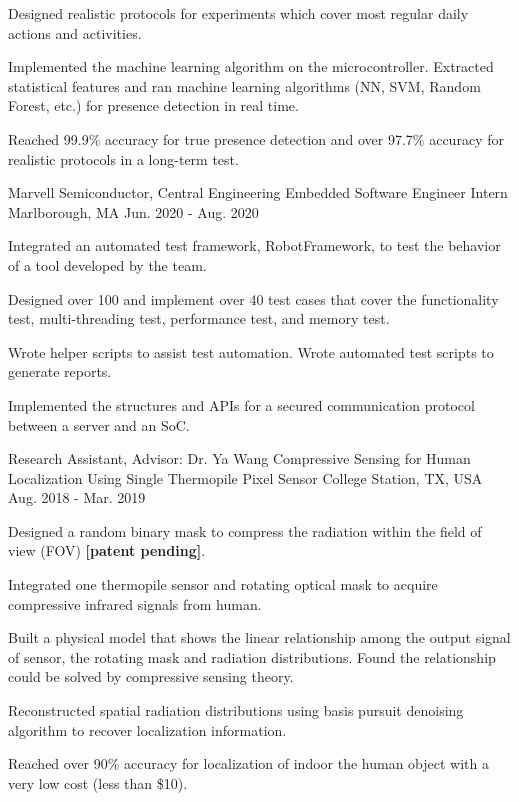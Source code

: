 \begin{cventries}
{\begin{cvitems}
        \item Designed realistic protocols for experiments which cover most regular daily actions and activities. 
        \item Implemented the machine learning algorithm on the microcontroller. Extracted statistical features and ran machine learning algorithms (NN, SVM, Random Forest, etc.) for presence detection in real time.
        \item Reached 99.9\% accuracy for true presence detection and over 97.7\% accuracy for realistic protocols in a long-term test. 
      \end{cvitems}
    }
  \cventry
  {Marvell Semiconductor, Central Engineering} 
  {Embedded Software Engineer Intern} %
  {Marlborough, MA} %
  {Jun. 2020 - Aug. 2020} %
  {
    \begin{cvitems} %
      \item Integrated an automated test framework, RobotFramework, to test the behavior of a tool developed by the team.
      \item Designed over 100 and implement over 40 test cases that cover the functionality test, multi-threading test, performance test, and memory test.
      \item Wrote helper scripts to assist test automation. Wrote automated test scripts to generate reports.
      \item Implemented the structures and APIs for a secured communication protocol between a server and an SoC.
    \end{cvitems}
  }

  

  \cventry
    {Research Assistant, Advisor: Dr. Ya Wang} %
    {Compressive Sensing for Human Localization Using Single Thermopile Pixel Sensor} %
    {College Station, TX, USA} %
    {Aug. 2018 - Mar. 2019} %
    {
      \begin{cvitems} %
        \item Designed a random binary mask to compress the radiation within the field of view (FOV) \textbf{[patent pending]}.
        \item Integrated one thermopile sensor and rotating optical mask to acquire compressive infrared signals from human.
        \item Built a physical model that shows the linear relationship among the output signal of sensor, the rotating mask and radiation distributions. Found the relationship could be solved by compressive sensing theory.
        \item Reconstructed spatial radiation distributions using basis pursuit denoising algorithm to recover localization information.
        \item Reached over 90\% accuracy for localization of indoor the human object with a very low cost (less than \$10).
      \end{cvitems}
    }


\end{cventries}

